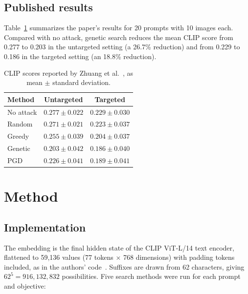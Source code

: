 \documentclass[11pt]{article}
\begin{document}
\subsection{Published results}

Table~\ref{tab:published} summarizes the paper's results for 20 prompts
with 10 images each. Compared with no attack, genetic search reduces
the mean CLIP score from 0.277 to 0.203 in the untargeted setting
(a 26.7\% reduction) and from 0.229 to 0.186 in the targeted setting
(an 18.8\% reduction).

\begin{table}[htbp]
\centering
\small
\caption{CLIP scores reported by Zhuang et al.~\cite[Table~1]{zhuang2023}, as mean $\pm$ standard deviation.}
\label{tab:published}
\begin{tabular}{@{}lcc@{}}
\toprule
\textbf{Method} & \textbf{Untargeted} & \textbf{Targeted} \\
\midrule
No attack & $0.277\pm0.022$ & $0.229\pm0.030$ \\
Random & $0.271\pm0.021$ & $0.223\pm0.037$ \\
Greedy & $0.255\pm0.039$ & $0.204\pm0.037$ \\
Genetic & $0.203\pm0.042$ & $0.186\pm0.040$ \\
PGD & $0.226\pm0.041$ & $0.189\pm0.041$ \\
\bottomrule
\end{tabular}
\end{table}

\section{Method}

\subsection{Implementation}

The embedding is the final hidden state of the CLIP ViT-L/14 text encoder, flattened to 59,136 values (77 tokens $\times$ 768 dimensions) with padding tokens included, as in the authors' code~\cite{qfcode}. Suffixes are drawn from 62 characters, giving $62^{5}=916{,}132{,}832$ possibilities. Five search methods were run for each prompt and objective:
\end{document}
